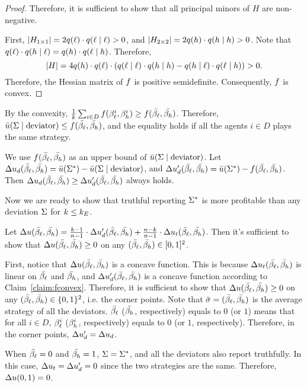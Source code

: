 \begin{proof}
Therefore, it is sufficient to show that all principal minors of $H$ are non-negative. 

First, $|H_{1\times 1}| = 2q(\ell) \cdot q(\ell \mid \ell) > 0$, and $|H_{2\times 2} |= 2q(h) \cdot q(h \mid h) > 0$. Note that $q(\ell)\cdot q(h \mid \ell) = q(h)\cdot q(\ell \mid h)$. Therefore, 
\begin{equation*}
    |H| = 4q(h)\cdot q(\ell) \cdot (q(\ell\mid\ell)\cdot q(h\mid h) - q(h\mid \ell)\cdot q(\ell \mid h)) > 0.
\end{equation*}
Therefore, the Hessian matrix of $f$ is positive semidefinite. Consequently, $f$ is convex. 
\end{proof}
By the convexity, $\frac{1}{k} \sum_{i\in D} f(\beta_{\ell}^i, \beta_{h}^i) \ge f(\bar{\beta_{\ell}}, \bar{\beta_{h}})$. Therefore, $\bar{u}(\Sigma\mid \text{deviator}) \le f(\bar{\beta_{\ell}}, \bar{\beta_{h}})$, and the equality holds if all the agents $i\in D$ plays the same strategy. 

We use $f(\bar{\beta_{\ell}}, \bar{\beta_{h}})$ as an upper bound of $\bar{u}(\Sigma\mid \text{deviator})$. Let $\Delta u_d (\bar{\beta_{\ell}}, \bar{\beta_{h}}) = \bar{u}(\Sigma^*) - \bar{u}(\Sigma\mid \text{deviator})$, and $\Delta u_d' (\bar{\beta_{\ell}}, \bar{\beta_{h}}) = \bar{u}(\Sigma^*) - f(\bar{\beta_{\ell}}, \bar{\beta_{h}})$. Then $\Delta u_d (\bar{\beta_{\ell}}, \bar{\beta_{h}}) \ge \Delta u_d' (\bar{\beta_{\ell}}, \bar{\beta_{h}})$ always holds. 

Now we are ready to show that truthful reporting $\Sigma^*$ is more profitable than any deviation $\Sigma$ for $k \le k_E$. 

Let $\Delta u(\bar{\beta_{\ell}}, \bar{\beta_{h}}) = \frac{k-1}{n -1} \cdot\Delta u_d' (\bar{\beta_{\ell}}, \bar{\beta_{h}}) + \frac{n -k}{n -1} \cdot \Delta u_t(\bar{\beta_{\ell}}, \bar{\beta_{h}})$. Then it's sufficient to show that $\Delta u(\bar{\beta_{\ell}}, \bar{\beta_{h}}) \ge 0$ on any $(\bar{\beta_{\ell}}, \bar{\beta_{h}}) \in [0, 1]^2$. 

First, notice that $\Delta u(\bar{\beta_{\ell}}, \bar{\beta_{h}})$ is a  concave function. This is because $\Delta u_t(\bar{\beta_{\ell}}, \bar{\beta_{h}})$ is linear on $\bar{\beta_{\ell}}$ and $\bar{\beta_{h}}$, and $\Delta u_d' (\bar{\beta_{\ell}}, \bar{\beta_{h}})$ is a concave function according to Claim~\ref{claim:fconvex}. Therefore, it is sufficient to show that $\Delta u(\bar{\beta_{\ell}}, \bar{\beta_{h}}) \ge 0$ on any $(\bar{\beta_{\ell}}, \bar{\beta_{h}}) \in \{0, 1\}^2$, i.e. the corner points. Note that $\bar{\sigma} = (\bar{\beta_{\ell}}, \bar{\beta_{h}})$ is the average strategy of all the deviators. $\bar{\beta_{\ell}}$ ($\bar{\beta_{h}}$, respectively) equals to $0$ (or $1$) means that for all $i\in D$, $\beta_{\ell}^i$ ($\beta_{h}^i$, respectively) equals to $0$ (or $1$, respectively). Therefore, in the corner points, $\Delta u_d' = \Delta u_d$. 

When $\bar{\beta_{\ell}} = 0$ and $\bar{\beta_{h}} = 1$, $\Sigma = \Sigma^*$, and all the deviators also report truthfully. In this case, $\Delta u_t = \Delta u_d' = 0$ since the two strategies are the same. Therefore, $\Delta u(0, 1) = 0$. 

